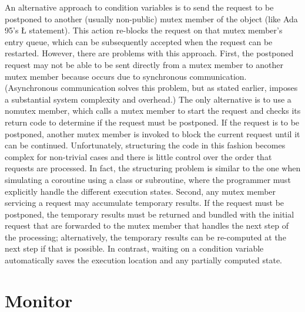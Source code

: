 \documentclass[openright,twoside]{report}
\begin{document}
An alternative approach to condition variables is to send the request to be postponed to another (usually non-public) mutex member of the object (like Ada 95's \LGinlinetrue\LGbegin\lgrinde\L{}\endlgrinde\LGend{} statement).
This action re-blocks the request on that mutex member's entry queue, which can be subsequently accepted when the request can be restarted.
However, there are problems with this approach.
First, the postponed request may not be able to be sent directly from a mutex member to another mutex member because  occurs due to synchronous communication.
(Asynchronous communication solves this problem, but as stated earlier, imposes a substantial system complexity and overhead.)
The only alternative is to use a nomutex member, which calls a mutex member to start the request and checks its return code to determine if the request must be postponed.
If the request is to be postponed, another mutex member is invoked to block the current request until it can be continued.
Unfortunately, structuring the code in this fashion becomes complex for non-trivial cases and there is little control over the order that requests are processed.
In fact, the structuring problem is similar to the one when simulating a coroutine using a class or subroutine, where the programmer must explicitly handle the different execution states.
Second, any mutex member servicing a request may accumulate temporary results.
If the request must be postponed, the temporary results must be returned and bundled with the initial request that are forwarded to the mutex member that handles the next step of the processing;
alternatively, the temporary results can be re-computed at the next step if that is possible.
In contrast, waiting on a condition variable automatically saves the execution location and any partially computed state.


\section{Monitor}
\label{s:Monitor}
\end{document}
